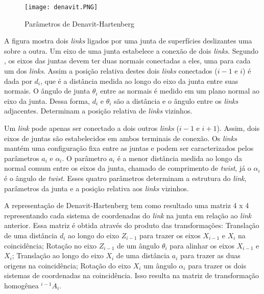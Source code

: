 \begin{figure}[h!]												
	\centering												
	\texttt{[image: denavit.PNG]}			
	\caption{Parâmetros de Denavit-Hartenberg}		
	\label{img:denavit}	
\end{figure}

A figura mostra dois \textit{links} ligados por uma junta de superfícies deslizantes uma sobre a outra. Um eixo de uma junta estabelece a conexão de dois \textit{links}. Segundo \cite{romanorobotica}, os eixos das juntas devem ter duas normais conectadas a eles, uma para cada um dos \textit{links}. Assim a posição relativa destes dois \textit{links} conectados ($i-1$ e $i$) é dada por $d_{i}$, que é a distância medida ao longo do eixo da junta entre suas normais. O ângulo de junta $\theta_{i}$ entre as normais é medido em um plano normal ao eixo da junta. Dessa forma, $d_{i}$ e $\theta_{i}$ são a distância e o ângulo entre os \textit{links} adjacentes. Determinam a posição relativa de \textit{links} vizinhos.

Um \textit{link} pode apenas ser conectado a dois outros \textit{links} ($i-1$ e $i+1$). Assim, dois eixos de juntas são estabelecidos em ambos terminais de conexão. Os \textit{links} mantém uma configuração fixa entre as juntas e podem ser caracterizados pelos parâmetros $a_{i}$ e $\alpha_{i}$. O parâmetro $a_{i}$ é a menor distância medida ao longo da normal comum entre os eixos da junta, chamado de comprimento de \textit{twist}, já o $\alpha_{i}$ é o ângulo de \textit{twist}. Esses quatro parâmetros determinam a estrutura do \textit{link}, parâmetros da junta e a posição relativa aos \textit{links} vizinhos.

A representação de Denavit-Hartenberg \cite{denavit1955kinematic} tem como resultado uma matriz 4 x 4 representando cada sistema de coordenadas do \textit{link} na junta em relação ao \textit{link} anterior. Essa matriz é obtida através do produto das transformações: Translação de uma distância $d_{i}$ ao longo do eixo $Z_{i-1}$ para trazer os eixos $X_{i-1}$ e $X_{i}$ na coincidência; Rotação no eixo $Z_{i-1}$ de um ângulo $\theta_{i}$ para alinhar os eixos $X_{i-1}$ e $X_{i}$; Translação ao longo do eixo $X_{i}$ de uma distância $a_{i}$ para trazer as duas origens na coincidência; Rotação do eixo $X_{i}$ um ângulo $\alpha_{i}$ para trazer os dois sistemas de coordenadas na coincidência. Isso resulta na matriz de transformação homogênea $^{i-1}A_{i}$.

